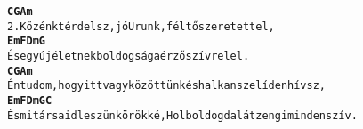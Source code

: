 \newpage
{}
\kottastart
{}
\kottaend
\begin{minipage}{\textwidth}
\begin{alltt}
\textbf{    C                          G             Am}
2. Közénk térdelsz, jó Urunk, féltő szeretettel,
\textbf{          Em          F         Dm           G}
   És egy új életnek boldogsága érző szívre lel.
\textbf{       C                                 G               Am}
   Én tudom, hogy itt vagy közöttünk és halkan szelíden hívsz,
\textbf{          Em             F            Dm           G             C}
   És mi társaid leszünk örökké, Hol boldog dalát zengi minden szív.
\end{alltt}
\vspace{0.0cm}
\versszakspacing
\end{minipage}
